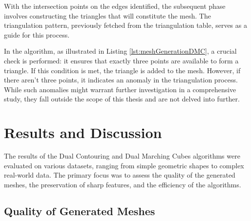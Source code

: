 With the intersection points on the edges identified, the subsequent phase involves constructing the triangles that will constitute the mesh. The triangulation pattern, previously fetched from the triangulation table, serves as a guide for this process. 

In the algorithm, as illustrated in Listing \ref{lst:meshGenerationDMC}, a crucial check is performed: it ensures that exactly three points are available to form a triangle. If this condition is met, the triangle is added to the mesh. However, if there aren't three points, it indicates an anomaly in the triangulation process. While such anomalies might warrant further investigation in a comprehensive study, they fall outside the scope of this thesis and are not delved into further.

\section{Results and Discussion}

The results of the Dual Contouring and Dual Marching Cubes algorithms were evaluated on various datasets, ranging from simple geometric shapes to complex real-world data. The primary focus was to assess the quality of the generated meshes, the preservation of sharp features, and the efficiency of the algorithms.

\subsection{Quality of Generated Meshes}

